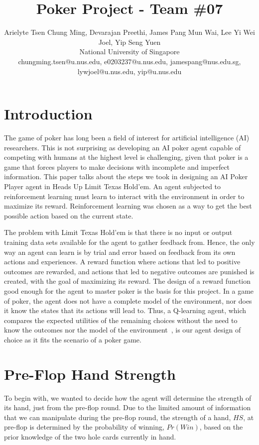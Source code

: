 \documentclass{article}
\title{Poker Project - Team \#07}
\author{
Arielyte Tsen Chung Ming, Devarajan Preethi, James Pang Mun Wai, Lee Yi Wei Joel, Yip Seng Yuen
\\ 
National University of Singapore\\
%
chungming.tsen@u.nus.edu, e0203237@u.nus.edu, jamespang@nus.edu.sg, lywjoel@u.nus.edu, yip@u.nus.edu
}
\begin{document}
\maketitle

\section{Introduction}

The game of poker has long been a field of interest for artificial intelligence (AI) researchers. This is not surprising as developing an AI poker agent capable of competing with humans at the highest level is challenging, given that poker is a game that forces players to make decisions with incomplete and imperfect information. This paper talks about the steps we took in designing an AI Poker Player agent in Heads Up Limit Texas Hold'em. An agent subjected to reinforcement learning must learn to interact with the environment in order to maximize its reward. Reinforcement learning was chosen as a way to get the best possible action based on the current state.

The problem with Limit Texas Hold'em is that there is no input or output training data sets available for the agent to gather feedback from. Hence, the only way an agent can learn is by trial and error based on feedback from its own actions and experiences. A reward function where actions that led to positive outcomes are rewarded, and actions that led to negative outcomes are punished is created, with the goal of maximizing its reward. The design of a reward function good enough for the agent to master poker is the basis for this project. In a game of poker, the agent does not have a complete model of the environment, nor does it know the states that its actions will lead to. Thus, a Q-learning agent, which compares the expected utilities of the remaining choices without the need to know the outcomes nor the model of the environment~\cite{russell-norvig:Modern}, is our agent design of choice as it fits the scenario of a poker game.

\section{Pre-Flop Hand Strength}

To begin with, we wanted to decide how the agent will determine the strength of its hand, just from the pre-flop round. Due to the limited amount of information that we can manipulate during the pre-flop round, the strength of a hand, $HS$, at pre-flop is determined by the probability of winning, $Pr(Win)$, based on the prior knowledge of the two hole cards currently in hand. 
\end{document}
